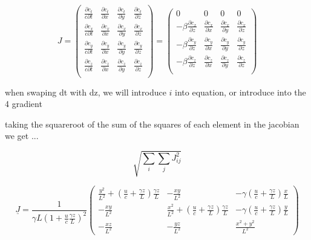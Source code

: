\begin{equation}
	J =
	\begin{pmatrix}
		\frac{\partial c_t}{c\partial t} & \frac{\partial c_t}{\partial x} & \frac{\partial c_t}{\partial y} & \frac{\partial c_t}{\partial z}\\
		\frac{\partial c_x}{c \partial t} & \frac{\partial c_x}{\partial x} & \frac{\partial c_x}{\partial y} & \frac{\partial c_x}{\partial z} \\
		\frac{\partial c_y}{c \partial t} & \frac{\partial c_y}{\partial x} & \frac{\partial c_y}{\partial y} & \frac{\partial c_y}{\partial z} \\
		\frac{\partial c_z}{c \partial t} & \frac{\partial c_z}{\partial x} & \frac{\partial c_z}{\partial y} & \frac{\partial c_z}{\partial z} \\
	\end{pmatrix}
	=
	\begin{pmatrix}
		0                                 & 0                               & 0                               & 0                               \\
		-\beta\frac{\partial c_x}{\partial z} & \frac{\partial c_x}{\partial x} & \frac{\partial c_x}{\partial y} & \frac{\partial c_x}{\partial z} \\
		-\beta\frac{\partial c_y}{\partial z} & \frac{\partial c_y}{\partial x} & \frac{\partial c_y}{\partial y} & \frac{\partial c_y}{\partial z} \\
		-\beta\frac{\partial c_z}{\partial z} & \frac{\partial c_z}{\partial x} & \frac{\partial c_z}{\partial y} & \frac{\partial c_z}{\partial z} \\
	\end{pmatrix}
\end{equation}



when swaping dt with dz, we will introduce $i$ into equation, or introduce into the 4 gradient

taking the squareroot of the sum of the squares of each element in the jacobian we get ...

\begin{equation}
	\sqrt{ \sum_{i} \sum_{j}  J_{ij}^2 }
\end{equation}

\begin{equation}
	\underline{J} =
	\frac{1}{\gamma  L ( 1 + \frac{u}{c} \frac{\gamma z}{L} )^2}
	\begin{pmatrix}
		\frac{y^2}{ L^2} +\left( \frac{u}{c}  + \frac{ \gamma z }{L} \right)   \frac{\gamma z}{ L}  & - \frac{xy}{L^2}  & - \gamma ( \frac{u}{c}  + \frac{ \gamma z }{L} ) \frac{x}{L} \\
		- \frac{xy}{L^2}  & \frac{x^2}{ L^2} + \left( \frac{u}{c}  + \frac{ \gamma z }{L} \right)   \frac{\gamma z}{ L}  & - \gamma (  \frac{u}{c}  + \frac{\gamma z }{L} ) \frac{y}{L}
		\\
		- \frac{xz}{L^2} & - \frac{yz}{L^2} & \frac{ x^2 + y^2 }{ L^2}
	\end{pmatrix}
\end{equation}

